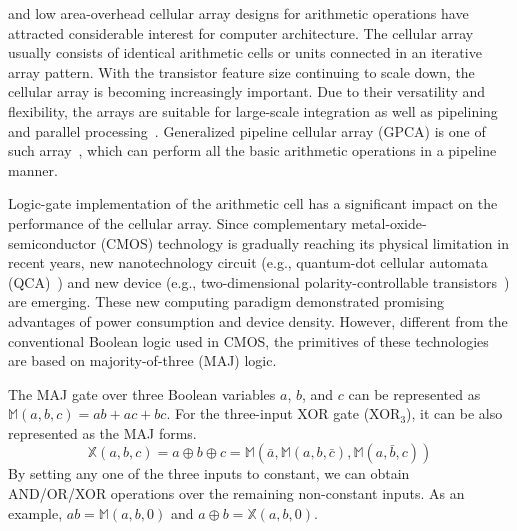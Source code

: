 \documentclass[9pt,journal,compsoc]{IEEEtran}
\begin{document}
\vspace{-2ex}
\maketitle
\IEEEdisplaynontitleabstractindextext
\IEEEpeerreviewmaketitle
{}%
 and low area-overhead cellular array designs for arithmetic operations have attracted considerable interest for computer architecture.
The cellular array usually consists of identical arithmetic cells or units connected in an iterative array pattern.
With the transistor feature size continuing to scale down, the cellular array is becoming increasingly important.
Due to their versatility and flexibility, the arrays are suitable for large-scale integration as well as pipelining and parallel processing~\cite{agrawal1979high,majithia1976some}.   
Generalized pipeline cellular array (GPCA) is one of such array~\cite{4}, which can perform all the basic arithmetic operations in a pipeline manner. 

Logic-gate implementation of the arithmetic cell has a significant impact on the performance of the cellular array.
Since complementary metal-oxide-semiconductor (CMOS) technology is gradually reaching its physical limitation in recent years, new nanotechnology circuit (e.g., quantum-dot cellular automata (QCA)~\cite{1}) and new device (e.g., two-dimensional polarity-controllable transistors~\cite{resta2018doping}) are emerging. 
These new computing paradigm demonstrated promising advantages of power consumption and device density. However, different from the conventional Boolean logic used in CMOS, the primitives of these technologies are based on majority-of-three (MAJ) logic. 

The MAJ gate over three Boolean variables $a$, $b$, and $c$ can be represented as $\mathbb{M}(a,b,c)=ab+ac+bc$.
For the three-input XOR gate (XOR$_3$), it can be also represented as the MAJ forms.  
\begin{equation}\label{equ_xor3}
\mathbb{X}(a,b,c)=a \oplus b \oplus c= \mathbb{M}(\bar a, \mathbb{M}(a,b,\bar c), \mathbb{M}(a,\bar b, c))
\end{equation} 
By setting any one of the three inputs to constant, we can obtain AND/OR/XOR operations over the remaining non-constant inputs.
As an example, $ab=\mathbb{M}(a,b,0)$ and $a\oplus b = \mathbb{X}(a,b,0)$. 
\end{document}
